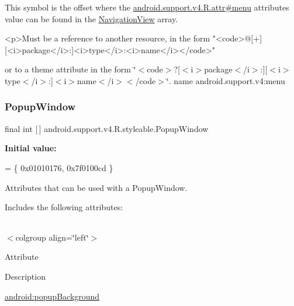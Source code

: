 This symbol is the offset where the \hyperlink{classandroid_1_1support_1_1v4_1_1R_1_1attr_a116926a875584a4fd631fc2f1113af9e}{android.\+support.\+v4.\+R.\+attr\#menu} attribute\textquotesingle{}s value can be found in the \hyperlink{classandroid_1_1support_1_1v4_1_1R_1_1styleable_a6e99b86cbaa0c61ca7598c15df537789}{Navigation\+View} array.

\begin{DoxyVerb}      <p>Must be a reference to another resource, in the form "<code>@[+][<i>package</i>:]<i>type</i>:<i>name</i></code>"
\end{DoxyVerb}
 or to a theme attribute in the form \char`\"{}$<$code$>$?\mbox{[}$<$i$>$package$<$/i$>$\+:\mbox{]}\mbox{[}$<$i$>$type$<$/i$>$\+:\mbox{]}$<$i$>$name$<$/i$>$$<$/code$>$\char`\"{}.  name android.\+support.\+v4\+:menu \mbox{\label{classandroid_1_1support_1_1v4_1_1R_1_1styleable_ac336c55ce0f18f8d06778e7eab7b5f62}} 
\subsubsection{\texorpdfstring{Popup\+Window}{PopupWindow}}
{\footnotesize\ttfamily final int \mbox{[}$\,$\mbox{]} android.\+support.\+v4.\+R.\+styleable.\+Popup\+Window\hspace{0.3cm}{\ttfamily [static]}}

{\bfseries Initial value\+:}
\begin{DoxyCode}
= \{
            0x01010176, 0x7f0100cd
        \}
\end{DoxyCode}
Attributes that can be used with a Popup\+Window. 

Includes the following attributes\+:

\tabulinesep=1mm
\begin{longtabu} spread 0pt [c]{*{0}{|X[-1]}|}
\hline
\end{longtabu}
$<$colgroup align=\char`\"{}left\char`\"{}$>$ 

Attribute

Description 

{\ttfamily \hyperlink{classandroid_1_1support_1_1v4_1_1R_1_1styleable_a8d0ba5d280ce722ccd8a262e5a5a70ac}{android\+:popup\+Background}}

